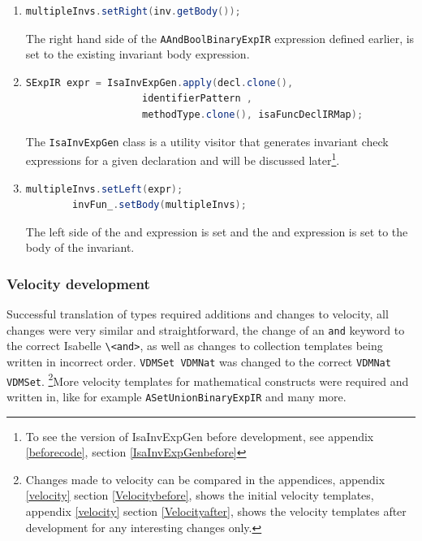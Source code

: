 \begin{enumerate}
		\item \begin{lstlisting}[language=Java]
		multipleInvs.setRight(inv.getBody()); 
	    \end{lstlisting}
	    The right hand side of the \lstinline[language=Java]{AAndBoolBinaryExpIR} expression defined earlier, is set to the existing invariant body expression.
	    \item \begin{lstlisting}[language=Java]
	    SExpIR expr = IsaInvExpGen.apply(decl.clone(), 
					identifierPattern , 
					methodType.clone(), isaFuncDeclIRMap);
	    \end{lstlisting}
	    The \lstinline[language=Java]{IsaInvExpGen} class is a utility visitor that generates invariant check expressions for a given declaration and will be discussed later\footnote{To see the version of IsaInvExpGen before development, see appendix \ref{beforecode}, section \ref{IsaInvExpGenbefore}}.
	    \item \begin{lstlisting}[language=Java]
	    multipleInvs.setLeft(expr);
       	invFun_.setBody(multipleInvs);
	    \end{lstlisting}
	    The left side of the and expression is set and the and expression is set to the body of the invariant.
	\end{enumerate}

	\subsubsection{Velocity development}
	Successful translation of types required additions and changes to velocity, all changes were very similar and straightforward, the change of an \lstinline[language=Velocity]{and} keyword to the correct Isabelle \lstinline[language=Velocity]{\<and>}, as well as changes to collection templates being written in incorrect order. \lstinline[language=Velocity]{VDMSet VDMNat} was changed to the correct \lstinline[language=Velocity]{VDMNat VDMSet}. \footnote{Changes made to velocity can be compared in the appendices, appendix \ref{velocity} section \ref{Velocitybefore}, shows the initial velocity templates, appendix \ref{velocity} section \ref{Velocityafter}, shows the velocity templates after development for any interesting changes only.}More velocity templates for mathematical constructs were required and written in, like for example \lstinline[language=Velocity]{ASetUnionBinaryExpIR} and many more. 

